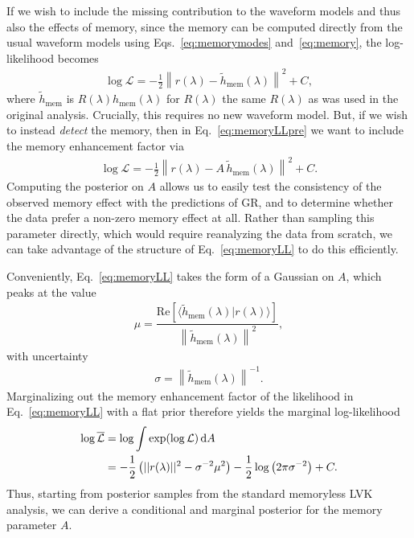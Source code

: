 \documentclass[aps,prd,reprint,twocolumn,10pt,eqsecnum,showpacs,nofootinbib,amsfonts,amssymb,amsmath,longbibliography,superscriptaddress,floatfix]{revtex4-1}
\begin{document}
If we wish to include the missing contribution to the waveform models and thus also the effects of memory, since the memory can be computed directly from the usual waveform models using Eqs.~\eqref{eq:memorymodes} and~\eqref{eq:memory}, the log-likelihood becomes
\begin{align}
	\label{eq:memoryLLpre}
	\log\mathcal{L}=-\frac{1}{2}\left\| r(\lambda)-\tilde{h}_{\mathrm{mem}}(\lambda)\right\|^2+C,
\end{align}
where $\tilde{h}_{\mathrm{mem}}$ is $R(\lambda)h_{\mathrm{mem}}(\lambda)$ for $R(\lambda)$ the same $R(\lambda)$ as was used in the original analysis. Crucially, this requires no new waveform model. But, if we wish to instead \emph{detect} the memory, then in Eq.~\eqref{eq:memoryLLpre} we want to include the memory enhancement factor via
\begin{align}
	\label{eq:memoryLL}
	\log\mathcal{L}=-\frac{1}{2}\left\| r(\lambda)-A\,\tilde{h}_{\mathrm{mem}}(\lambda)\right\|^2+C.
\end{align}
Computing the posterior on $A$ allows us to easily test the consistency of the observed memory effect with the predictions of GR, and to determine whether the data prefer a non-zero memory effect at all.
Rather than sampling this parameter directly, which would require reanalyzing the data from scratch, we can take advantage of the structure of Eq.~\eqref{eq:memoryLL} to do this efficiently.

Conveniently, Eq.~\eqref{eq:memoryLL} takes the form of a Gaussian on $A$, which peaks at the value
\begin{align}
	\label{eq:mean}
	\mu=\dfrac{\mathrm{Re}\left[\langle\tilde{h}_{\mathrm{mem}}(\lambda)|r(\lambda)\rangle\right]}{\left\|\tilde{h}_{\mathrm{mem}}(\lambda)\right\|^2},
\end{align}
with uncertainty
\begin{align}
	\label{eq:stddev}
	\sigma=\left\|\tilde{h}_{\mathrm{mem}}(\lambda)\right\|^{-1}.
\end{align}
Marginalizing out the memory enhancement factor of the likelihood in Eq.~\eqref{eq:memoryLL} with a flat prior therefore yields the marginal log-likelihood
\begin{align}
	\label{eq:marginalLL}
	\log\overline{\mathcal{L}}&=\log\int\exp(\log\mathcal{L})\,{\rm d} A\nonumber\\&=-\frac{1}{2}\left(||r(\lambda)||^{2}-\sigma^{-2}\mu^{2}\right)-\frac{1}{2}\log\left(2\pi\sigma^{-2}\right)+C.
\end{align}
Thus, starting from posterior samples from the standard memoryless LVK analysis, we can derive a conditional and marginal posterior for the memory parameter $A$.
\end{document}
